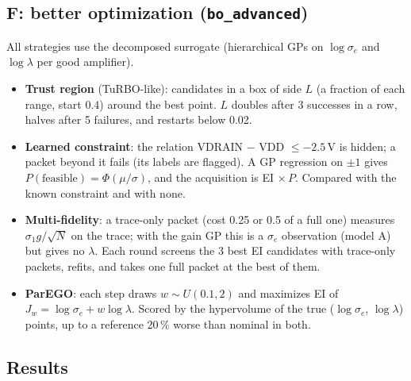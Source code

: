 \documentclass[10pt]{article}
\newcommand{\code}[1]{\texttt{#1}}
\begin{document}
\subsection{F: better optimization (\code{bo\_advanced})}
\begin{advanced}
All strategies use the decomposed surrogate (hierarchical GPs on $\log\sigma_e$ and $\log\lambda$ per good amplifier).
\begin{itemize}
\item \textbf{Trust region} (TuRBO-like): candidates in a box of side $L$ (a fraction of each range, start 0.4) around the best point. $L$
  doubles after 3 successes in a row, halves after 5 failures, and restarts below 0.02.
\item \textbf{Learned constraint}: the relation VDRAIN $-$ VDD $\le -2.5$\,V is hidden; a packet beyond it fails (its labels are flagged).
  A GP regression on $\pm1$ gives $P(\text{feasible}) = \Phi(\mu/\sigma)$, and the acquisition is EI$\,\times P$. Compared with the
  known constraint and with none.
\item \textbf{Multi-fidelity}: a trace-only packet (cost 0.25 or 0.5 of a full one) measures $\sigma_1 g/\sqrt N$ on the trace; with the gain
  GP this is a $\sigma_e$ observation (model A) but gives no $\lambda$. Each round screens the 3 best EI candidates with trace-only
  packets, refits, and takes one full packet at the best of them.
\item \textbf{ParEGO}: each step draws $w \sim U(0.1, 2)$ and maximizes EI of $J_w = \log\sigma_e + w\log\lambda$. Scored by the
  hypervolume of the true ($\log\sigma_e$, $\log\lambda$) points, up to a reference 20\,\% worse than nominal in both.
\end{itemize}
\end{advanced}

\subsection{Results}
\end{document}
